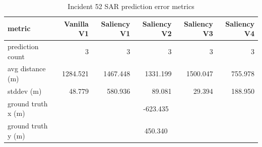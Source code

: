 \begin{table}[ht]
\centering
\caption{Incident 52 SAR prediction error metrics}
\label{tab:sar-incident-52}
\begin{tabular}{lrrrrr}
\hline
metric & Vanilla V1 & Saliency V1 & Saliency V2 & Saliency V3 & Saliency V4 \\
\hline
prediction count & 3 & 3 & 3 & 3 & 3 \\
avg distance (m) & 1284.521 & 1467.448 & 1331.199 & 1500.047 & 755.978 \\
stddev (m) & 48.779 & 580.936 & 89.081 & 29.394 & 188.950 \\
ground truth x (m) & \multicolumn{5}{c}{-623.435} \\
ground truth y (m) & \multicolumn{5}{c}{450.340} \\
\hline
\end{tabular}
\end{table}
